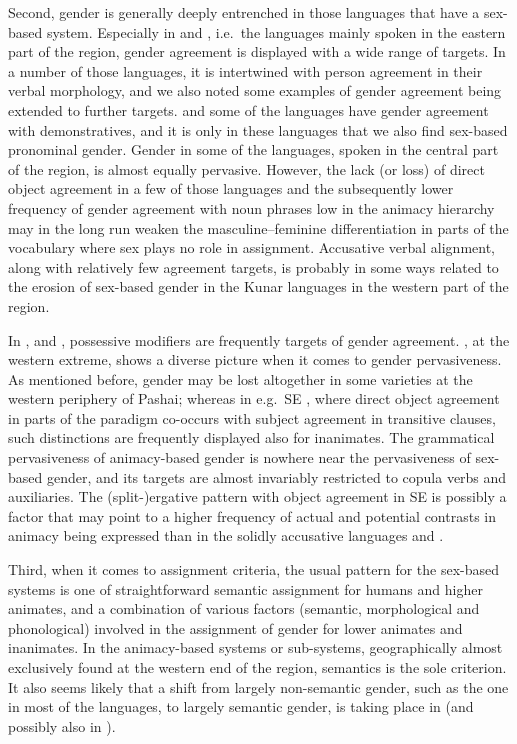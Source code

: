 \documentclass[output=collectionpaper]{langsci/langscibook}
\begin{document}
Second, gender is generally deeply entrenched in those languages that have a sex-based system. Especially in  and , i.e.\ the languages mainly spoken in the eastern part of the region, gender agreement is displayed with a wide range of targets. In a number of those languages, it is intertwined with person agreement in their verbal morphology, and we also noted some examples of gender agreement being extended to further targets.  and some of the  languages have gender agreement with demonstratives, and it is only in these languages that we also find sex-based pronominal gender. Gender in some of the  languages, spoken in the central part of the region, is almost equally pervasive. However, the lack (or loss) of direct object agreement in a few of those languages and the subsequently lower frequency of gender agreement with noun phrases low in the animacy hierarchy may in the long run weaken the masculine--feminine differentiation in parts of the vocabulary where sex plays no role in assignment. Accusative verbal alignment, along with relatively few agreement targets, is probably in some ways related to the erosion of sex-based gender in the Kunar languages in the western part of the region.

In ,  and , possessive modifiers are frequently targets of gender agreement. , at the western extreme, shows a diverse picture when it comes to gender pervasiveness. As mentioned before, gender may be lost altogether in some varieties at the western periphery of Pashai; whereas in e.g.\ SE , where direct object agreement in parts of the paradigm co-occurs with subject agreement in transitive clauses, such distinctions are frequently displayed also for inanimates. The grammatical pervasiveness of animacy-based gender is nowhere near the pervasiveness of sex-based gender, and its targets are almost invariably restricted to copula verbs and auxiliaries. The (split-)ergative pattern with object agreement in SE  is possibly a factor that may point to a higher frequency of actual and potential contrasts in animacy being expressed than in the solidly accusative languages  and .

Third, when it comes  to assignment criteria, the usual pattern for the sex-based systems is one of straightforward semantic assignment for humans and higher animates, and a combination of various factors (semantic, morphological and phonological) involved in the assignment of gender for lower animates and inanimates. In the animacy-based systems or sub-systems, geographically almost exclusively found at the western end of the region, semantics is the sole criterion. It also seems likely that a shift from largely non-semantic gender, such as the one in most of the  languages, to largely semantic gender, is taking place in  (and possibly also in ).
\end{document}
